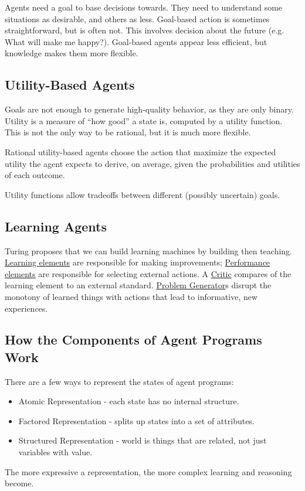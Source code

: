 Agents need a goal to base decisions towards.
They need to understand some situations as desirable, and others as less.
Goal-based action is sometimes straightforward, but is often not.
This involves decision about the future (e.g. What will make me happy?).
Goal-based agents appear less efficient, but knowledge makes them more flexible.


\subsection{Utility-Based Agents} %
\label{sub:utility_based_agents}

Goals are not enough to generate high-quality behavior, as they are only binary.
Utility is a measure of ``how good'' a state is, computed by a utility function.
This is not the only way to be rational, but it is much more flexible.
\begin{em}
    Rational utility-based agents choose the action that maximize the expected
    utility the agent expects to derive, on average, given the probabilities and
    utilities of each outcome.
\end{em}
Utility functions allow tradeoffs between different (possibly uncertain) goals.


\subsection{Learning Agents} %
\label{sub:learning_agents}

Turing proposes that we can build learning machines by building then teaching.
\uline{Learning elements} are responsible for making improvements;
\uline{Performance elements} are responsible for selecting external actions.
A \uline{Critic} compares of the learning element to an external standard.
\uline{Problem Generator}s disrupt the monotony of learned things with actions
that lead to informative, new experiences.


\subsection{How the Components of Agent Programs Work} %
\label{sub:how_the_components_of_agent_programs_work}

There are a few ways to represent the states of agent programs:
\begin{itemize}
    \item Atomic Representation - each state has no internal structure.
    \item Factored Representation - splits up states into a set of attributes.
    \item Structured Representation - world is things that are related, not just
    variables with value.
\end{itemize}
The more expressive a representation, the more complex learning and reasoning
become.

